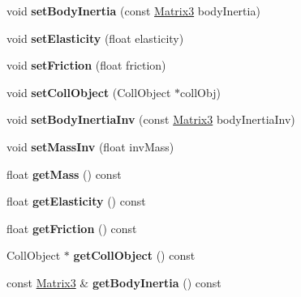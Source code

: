 \begin{DoxyCompactItemize}
void {\bfseries set\+Body\+Inertia} (const \hyperlink{classVectormath_1_1Aos_1_1Matrix3}{Matrix3} body\+Inertia)
\item 
\mbox{\label{classTrbDynBody_af48bbda40cb47f0b68dc5cb73b2e0b69}} 
void {\bfseries set\+Elasticity} (float elasticity)
\item 
\mbox{\label{classTrbDynBody_a3c27f2e9ae31167a57076e4c29bb0639}} 
void {\bfseries set\+Friction} (float friction)
\item 
\mbox{\label{classTrbDynBody_aac23aacc5358a75a0c23a7d07e9b1ba8}} 
void {\bfseries set\+Coll\+Object} (Coll\+Object $\ast$coll\+Obj)
\item 
\mbox{\label{classTrbDynBody_a22693d017bd96fb2b88b6600a9942574}} 
void {\bfseries set\+Body\+Inertia\+Inv} (const \hyperlink{classVectormath_1_1Aos_1_1Matrix3}{Matrix3} body\+Inertia\+Inv)
\item 
\mbox{\label{classTrbDynBody_a0e37f5368721b8a76dd8590fdb40fb10}} 
void {\bfseries set\+Mass\+Inv} (float inv\+Mass)
\item 
\mbox{\label{classTrbDynBody_a5cf4d76cac92cc694c2f9f7d992cae93}} 
float {\bfseries get\+Mass} () const
\item 
\mbox{\label{classTrbDynBody_a6206b9f6dbe93608140170f4c42fd23f}} 
float {\bfseries get\+Elasticity} () const
\item 
\mbox{\label{classTrbDynBody_aaf7fba06172899f050c5c99a3e8368e1}} 
float {\bfseries get\+Friction} () const
\item 
\mbox{\label{classTrbDynBody_ac93ec37adf65e7b67c897a6ec987a6cc}} 
Coll\+Object $\ast$ {\bfseries get\+Coll\+Object} () const
\item 
\mbox{\label{classTrbDynBody_a82095377cff88db6d2d61ecde4dfe4bc}} 
const \hyperlink{classVectormath_1_1Aos_1_1Matrix3}{Matrix3} \& {\bfseries get\+Body\+Inertia} () const
\item 
\mbox{\label{classTrbDynBody_a5ced739e0c9f73cc7b307bf0ec3c51ed}} 

\end{DoxyCompactItemize}
